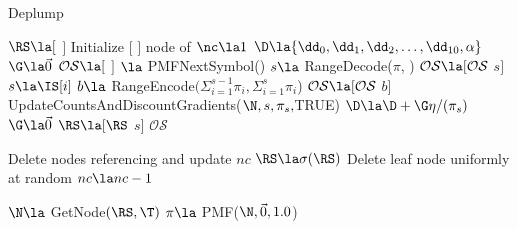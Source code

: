 \begin{algorithm}
    \caption{Deplump} \label{alg}
    \begin{algorithmic}[1]
    
		\State $\RS \la [$ $]  $ 
		\State Initialize $[$ $]$ node of \T {}
		\State $\nc \la 1$ 
		\State $\D \la  \{ \dd_0, \dd_1, \dd_2, \dots, \dd_{10}, \alpha \}$ 
		\State $\G \la \vec 0$ 
		\State $\mathcal{O}\mathcal{S} \la  [$ $]$ 
			\State [$\pi$, \N] $\la$ PMFNextSymbol(\RS)
				\State $s \la $ RangeDecode($\pi$, \IS)
				\State $\mathcal{O}\mathcal{S} \la [\mathcal{O}\mathcal{S}$ $s]$
			\Else
				\State $s \la \IS[i]$
				\State $b \la$ RangeEncode$(\Sigma_{i = 1}^{s-1} \pi_i, \Sigma_{i = 1}^{s} \pi_i$)
				\State $\mathcal{O}\mathcal{S} \la [\mathcal{O}\mathcal{S}$ $b]$		
			\EndIf
			\State UpdateCountsAndDiscountGradients($\N,s,\pi_s,$TRUE)
			\State $\D \la \D + \G \eta / (\pi_s)$ 
			\State $\G \la \vec 0$ 
			\State $\RS \la [\RS$ $s]$ 
		\EndFor
		\State \Return $\mathcal{O}\mathcal{S}$
	\EndProcedure
	
			\State Delete nodes referencing \RS[1] and update $nc$
			\State $\RS \la \sigma(\RS)$
		\EndWhile
			\State Delete leaf node uniformly at random
			\State $nc \la nc -1$
		\EndWhile
		
		\State $\N \la$ GetNode$(\RS, \T)$
		\State $\pi \la$ PMF($\N, \vec 0, 1.0$) 
		\State \Return [$\pi$, \N]
	\EndFunction
	
	
	 \end{algorithmic}
\end{algorithm}

